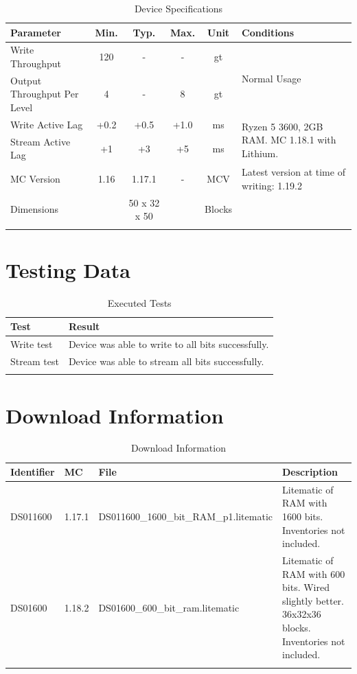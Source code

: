 \documentclass[10pt]{datasheet}
\begin{document}
\begin{table}[h]
    \caption{Device Specifications}
    \begin{tabularx}{\textwidth}{l | c c c | c | X}
        \thickhline
        \textbf{Parameter} & \textbf{Min.} & \textbf{Typ.} & \textbf{Max.} &
        \textbf{Unit} & \textbf{Conditions} \\
        \hline
        Write Throughput  & 120 & - & - & gt & \multirow{2}{*}{Normal Usage} \\
        Output Throughput Per Level & 4 & - & 8 & gt & \\
        \hline
        Write Active Lag & +0.2 & +0.5 & +1.0 & ms & \multirow{2}{5cm}{Ryzen 5 3600, 2GB RAM. MC 1.18.1 with Lithium.} \\
        Stream Active Lag & +1 & +3 & +5 & ms & \\
        \hline
        MC Version & 1.16 & 1.17.1 & - & MCV & Latest version at time of writing: 1.19.2\\
        \hline
        Dimensions & & 50 x 32 x 50 & & Blocks & \\
        \thickhline
\end{tabularx}
\end{table}
\newpage
\section{Testing Data}
\begin{table}[h]
\caption{Executed Tests}
\begin{tabularx}{\textwidth}{l | X}
    \thickhline
    \textbf{Test} & \textbf{Result} \\
    \hline
    Write test & Device was able to write to all bits successfully.\\
    \hline
    Stream test & Device was able to stream all bits successfully.\\
    \thickhline
\end{tabularx}
\end{table}

\section{Download Information}
\begin{table}[h]
    \caption{Download Information}
    \begin{tabularx}{\textwidth}{l | l | l | X}
        \thickhline
        \textbf{Identifier} & \textbf{MC} & \textbf{File} & \textbf{Description} \\
        \hline
        DS011600 & 1.17.1 & DS011600\_1600\_bit\_RAM\_p1.litematic & Litematic of RAM with 1600 bits. Inventories not included. \\
        \hline
        DS01600 & 1.18.2 & DS01600\_600\_bit\_ram.litematic & Litematic of RAM with 600 bits. Wired slightly better. 36x32x36 blocks. Inventories not included. \\
        \thickhline
    \end{tabularx}
\end{table}
\end{document}

